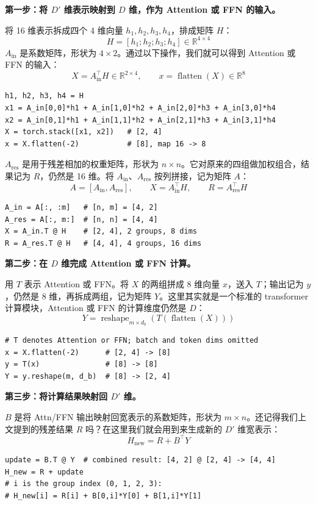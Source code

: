 \documentclass[11pt]{article}
\begin{document}
\textbf{第一步：将 $D'$ 维表示映射到 $D$ 维，作为 Attention 或 FFN 的输入。}

将 16 维表示拆成四个 4 维向量 $h_1, h_2, h_3, h_4$，排成矩阵 $H$：
\[
  H=[h_1;h_2;h_3;h_4]\in\mathbb{R}^{4\times4}
\]
$A_{\mathrm{in}}$ 是系数矩阵，形状为 $4\times2$。通过以下操作，我们就可以得到 Attention 或 FFN 的输入：
\[
  X=A_{\mathrm{in}}^\top H\in\mathbb{R}^{2\times4},\qquad x=\operatorname{flatten}(X)\in\mathbb{R}^{8}
\]
\begin{verbatim}
h1, h2, h3, h4 = H
x1 = A_in[0,0]*h1 + A_in[1,0]*h2 + A_in[2,0]*h3 + A_in[3,0]*h4
x2 = A_in[0,1]*h1 + A_in[1,1]*h2 + A_in[2,1]*h3 + A_in[3,1]*h4
X = torch.stack([x1, x2])   # [2, 4]
x = X.flatten(-2)           # [8], map 16 -> 8
\end{verbatim}

$A_{\mathrm{res}}$ 是用于残差相加的权重矩阵，形状为 $n\times n$。它对原来的四组做加权组合，结果记为 $R$，仍然是 16 维。将 $A_{\mathrm{in}}$、$A_{\mathrm{res}}$ 按列拼接，记为矩阵 $A$：
\[
  A=[A_{\mathrm{in}},A_{\mathrm{res}}],\qquad X=A_{\mathrm{in}}^\top H,\qquad R=A_{\mathrm{res}}^\top H
\]
\begin{verbatim}
A_in = A[:, :m]   # [n, m] = [4, 2]
A_res = A[:, m:]  # [n, n] = [4, 4]
X = A_in.T @ H    # [2, 4], 2 groups, 8 dims
R = A_res.T @ H   # [4, 4], 4 groups, 16 dims
\end{verbatim}

\textbf{第二步：在 $D$ 维完成 Attention 或 FFN 计算。}

用 $T$ 表示 Attention 或 FFN。将 $X$ 的两组拼成 8 维向量 $x$，送入 $T$；输出记为 $y$，仍然是 8 维，再拆成两组，记为矩阵 $Y$。这里其实就是一个标准的 transformer 计算模块，Attention 或 FFN 的计算维度仍然是 $D$：
\[
  Y=\operatorname{reshape}_{m\times d_b}\!\left(T(\operatorname{flatten}(X))\right)
\]
\begin{verbatim}
# T denotes Attention or FFN; batch and token dims omitted
x = X.flatten(-2)      # [2, 4] -> [8]
y = T(x)               # [8] -> [8]
Y = y.reshape(m, d_b)  # [8] -> [2, 4]
\end{verbatim}

\textbf{第三步：将计算结果映射回 $D'$ 维。}

$B$ 是将 Attn/FFN 输出映射回宽表示的系数矩阵，形状为 $m\times n$。还记得我们上文提到的残差结果 $R$ 吗？在这里我们就会用到来生成新的 $D'$ 维宽表示：
\[
  H_{\mathrm{new}}=R+B^\top Y
\]
\begin{verbatim}
update = B.T @ Y  # combined result: [4, 2] @ [2, 4] -> [4, 4]
H_new = R + update
# i is the group index (0, 1, 2, 3):
# H_new[i] = R[i] + B[0,i]*Y[0] + B[1,i]*Y[1]
\end{verbatim}
\end{document}
